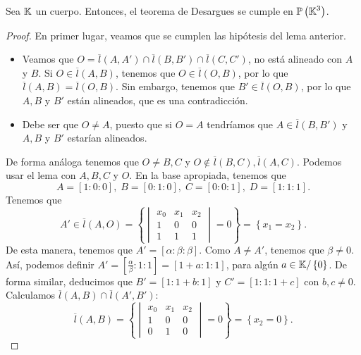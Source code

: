 \begin{theorem}
Sea $\displaystyle \mathbb{K} $ un cuerpo. Entonces, el teorema de Desargues se cumple en $\displaystyle \mathbb{P}\left(\mathbb{K}^{3}\right) $.
\end{theorem}
\begin{proof}
En primer lugar, veamos que se cumplen las hipótesis del lema anterior. 
\begin{itemize}
\item Veamos que $\displaystyle O = \overline{l}\left(A,A'\right) \cap \overline{l}\left(B,B'\right) \cap \overline{l}\left(C,C'\right) $, no está alineado con $\displaystyle A $ y $\displaystyle B $. Si $\displaystyle O \in \overline{l}\left(A,B\right) $, tenemos que $\displaystyle O \in \overline{l}\left(O,B\right) $, por lo que $\displaystyle \overline{l}\left(A,B\right) = \overline{l}\left(O,B\right) $. Sin embargo, tenemos que $\displaystyle B' \in \overline{l}\left(O,B\right) $, por lo que $\displaystyle A,B $ y $\displaystyle B' $ están alineados, que es una contradicción.
\item Debe ser que $\displaystyle O\neq A $, puesto que si $\displaystyle O = A $ tendríamos que $\displaystyle A \in \overline{l}\left(B,B'\right) $ y $\displaystyle A,B $ y $\displaystyle B' $ estarían alineados.
\end{itemize}
De forma análoga tenemos que $\displaystyle O \neq B,C $ y $\displaystyle O \not\in \overline{l}\left(B,C\right), \overline{l}\left(A,C\right) $. Podemos usar el lema con $\displaystyle A,B,C $ y $\displaystyle O $. En la base apropiada, tenemos que 
\[A = [1:0:0], \; B = [0:1:0], \; C = [0:0:1], \; D = [1:1:1] .\]
Tenemos que  
\[ A' \in \overline{l}\left(A,O\right) = \left\{ \begin{vmatrix} x_{0} & x_{1} & x_{2} \\ 1 & 0 & 0 \\ 1 & 1 & 1\end{vmatrix} = 0\right\} = \left\{ x_{1} = x_{2}\right\} .\]
De esta manera, tenemos que $\displaystyle A' = [\alpha : \beta : \beta] $. Como $\displaystyle A \neq A' $, tenemos que $\displaystyle \beta \neq 0 $. Así, podemos definir $\displaystyle A' = \left[\frac{\alpha }{\beta }: 1 : 1\right] = [1 + a: 1 : 1] $, para algún $\displaystyle a \in \mathbb{K}/ \left\{ 0\right\}  $.
De forma similar, deducimos que $\displaystyle B' = [1: 1 + b : 1] $ y $\displaystyle C' = [1:1:1 + c] $ con $\displaystyle b,c \neq 0 $. Calculamos $\displaystyle \overline{l}\left(A,B\right) \cap \overline{l}\left(A',B'\right) $:
\[\overline{l}\left(A,B\right) = \left\{ \begin{vmatrix} x_{0} & x_{1} & x_{2} \\ 1 & 0 & 0 \\ 0 & 1 & 0 \end{vmatrix} = 0\right\} = \left\{ x_{2} = 0\right\}   .\]

\end{proof}
